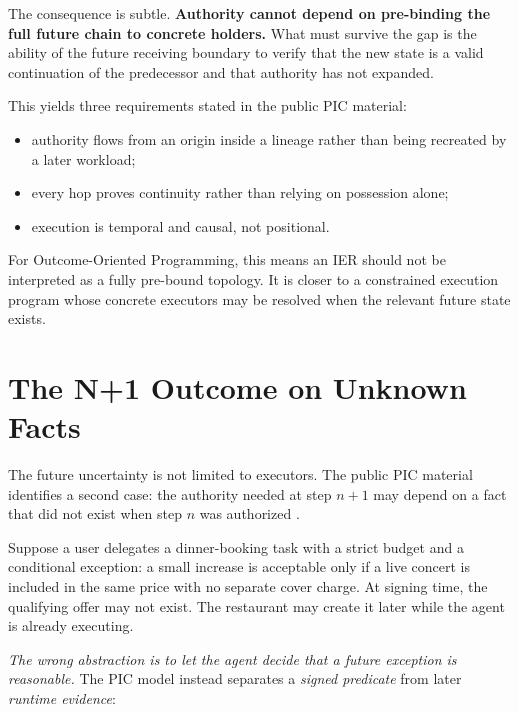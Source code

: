 \documentclass[10pt,oneside,openany]{book}
\begin{document}
The consequence is subtle. \textbf{Authority cannot depend on pre-binding the full future chain to concrete holders.} What must survive the gap is the ability of the future receiving boundary to verify that the new state is a valid continuation of the predecessor and that authority has not expanded.

This yields three requirements stated in the public PIC material:

\begin{itemize}
\item authority flows from an origin inside a lineage rather than being recreated by a later workload;
\item every hop proves continuity rather than relying on possession alone;
\item execution is temporal and causal, not positional.
\end{itemize}

For Outcome-Oriented Programming, this means an IER should not be interpreted as a fully pre-bound topology. It is closer to a constrained execution program whose concrete executors may be resolved when the relevant future state exists.

\chapter{The N+1 Outcome on Unknown Facts}

The future uncertainty is not limited to executors. The public PIC material identifies a second case: the authority needed at step $n+1$ may depend on a fact that did not exist when step $n$ was authorized \cite{picwhy}.

Suppose a user delegates a dinner-booking task with a strict budget and a conditional exception: a small increase is acceptable only if a live concert is included in the same price with no separate cover charge. At signing time, the qualifying offer may not exist. The restaurant may create it later while the agent is already executing.

\emph{The wrong abstraction is to let the agent decide that a future exception is reasonable.} The PIC model instead separates a \emph{signed predicate} from later \emph{runtime evidence}:
\end{document}
